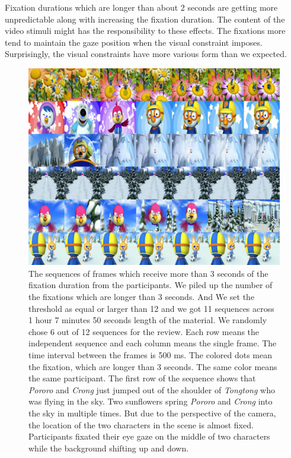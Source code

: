 \documentclass[10pt,letterpaper]{article}
\begin{document}
Fixation durations which are longer than about 2 seconds are getting more unpredictable along with increasing the fixation duration. The content of the video stimuli might has the responsibility to these effects. The fixations more tend to maintain the gaze position when the visual constraint imposes. Surprisingly, the visual constraints have more various form than we expected.

\begin{figure}
  \centerline{\includegraphics[width=178mm]{./eps/long_fixations.png}}
  \caption{The sequences of frames which receive more than 3 seconds of the fixation duration from the participants. We piled up the number of the fixations which are longer than 3 seconds. And We set the threshold as equal or larger than 12 and we got 11 sequences across 1 hour 7 minutes 50 seconds length of the material. We randomly chose 6 out of 12 sequences for the review. Each row means the independent sequence and each column means the single frame. The time interval between the frames is 500 ms. The colored dots mean the fixation, which are longer than 3 seconds. The same color means the same participant. The first row of the sequence shows that \textit{Pororo} and \textit{Crong} just jumped out of the shoulder of \textit{Tongtong} who was flying in the sky. Two sunflowers spring \textit{Pororo} and \textit{Crong} into the sky in multiple times. But due to the perspective of the camera, the location of the two characters in the scene is almost fixed. Participants fixated their eye gaze on the middle of two characters while the background shifting up and down.}
  \label{fig:long-fixations}
\end{figure}
\end{document}
